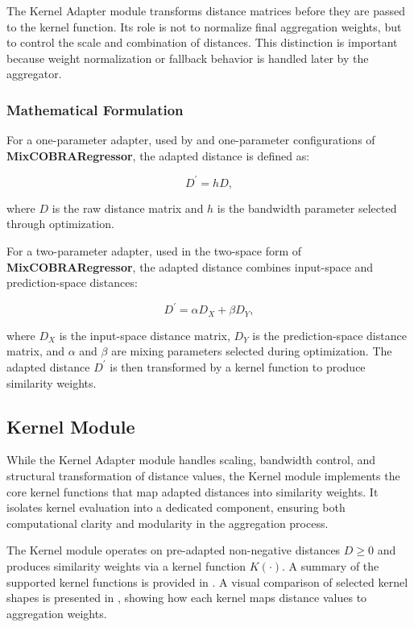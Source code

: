 \hs The Kernel Adapter module transforms distance matrices before they are passed to the kernel function. Its role is not to normalize final aggregation weights, but to control the scale and combination of distances. This distinction is important because weight normalization or fallback behavior is handled later by the aggregator.

\subsubsection*{Mathematical Formulation}

For a one-parameter adapter, used by \GradientCOBRA{} and one-parameter configurations of \textbf{MixCOBRARegressor}, the adapted distance is defined as:


\[
    D^{\prime} = hD,
\]

where $D$ is the raw distance matrix and $h$ is the bandwidth parameter selected through optimization.

For a two-parameter adapter, used in the two-space form of \textbf{MixCOBRARegressor}, the adapted distance combines input-space and prediction-space distances:

\[
    D^{\prime} = \alpha D_X + \beta D_Y,
\]

where $D_X$ is the input-space distance matrix, $D_Y$ is the prediction-space distance matrix, and $\alpha$ and $\beta$ are mixing parameters selected during optimization. The adapted distance $D^{\prime}$ is then transformed by a kernel function to produce similarity weights.

\subsection{Kernel Module}
\label{subsec:kernel_module}

\hs While the Kernel Adapter module handles scaling, bandwidth control, and structural transformation of distance values, the Kernel module implements the core kernel functions that map adapted distances into similarity weights. It isolates kernel evaluation into a dedicated component, ensuring both computational clarity and modularity in the aggregation process.

The Kernel module operates on pre-adapted non-negative distances $D \ge 0$ and produces similarity weights via a kernel function $K(\cdot)$. A summary of the supported kernel functions is provided in . A visual comparison of selected kernel shapes is presented in , showing how each kernel maps distance values to aggregation weights.


